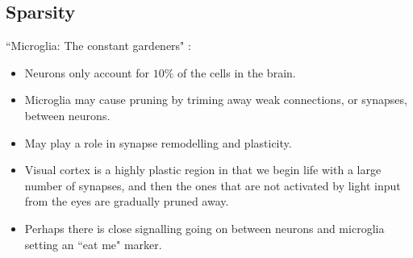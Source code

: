 \documentclass[11pt]{article}
\begin{document}
\subsection*{Sparsity}

``Microglia: The constant gardeners" \cite{gardening}:
\begin{itemize}
	\item Neurons only account for $10\%$ of the cells in the brain.
	\item Microglia may cause pruning by triming away weak connections, or synapses, between neurons.
	\item May play a role in synapse remodelling and plasticity.
	\item Visual cortex is a highly plastic region in that we begin life with a large number of synapses, and then the ones that are not activated by light input from the eyes are gradually pruned away. 
	\item Perhaps there is close signalling going on between neurons and microglia setting an ``eat me" marker.
\end{itemize}



\end{document}
